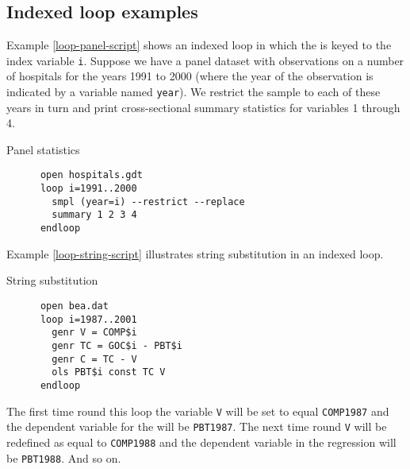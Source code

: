 \subsection{Indexed loop examples}


Example \ref{loop-panel-script} shows an indexed loop in which
	the  is keyed to the index variable
	\verb+i+.  Suppose we have a panel dataset with
	observations on a number of hospitals for the years 1991 to
	2000 (where the year of the observation is indicated by a
	variable named \verb+year+).  We restrict the
	sample to each of these years in turn and print
	cross-sectional summary statistics for variables 1 through
	4.

\begin{script}[htbp]
\caption{Panel statistics}
\label{loop-panel-script}

\begin{verbatim}
	  open hospitals.gdt
	  loop i=1991..2000
	    smpl (year=i) --restrict --replace
	    summary 1 2 3 4
	  endloop\end{verbatim}
\end{script}


	Example \ref{loop-string-script} illustrates string
	substitution in an indexed loop.

\begin{script}[htbp]
\caption{String
	  substitution}
\label{loop-string-script}

\begin{verbatim}
	  open bea.dat
	  loop i=1987..2001
	    genr V = COMP$i
	    genr TC = GOC$i - PBT$i
	    genr C = TC - V
	    ols PBT$i const TC V
	  endloop\end{verbatim}
\end{script}

The first time round this loop the variable
	\verb+V+ will be set to equal
	\verb+COMP1987+ and the dependent variable for the
	 will be \verb+PBT1987+. The
	next time round \verb+V+ will be redefined as
	equal to \verb+COMP1988+ and the dependent
	variable in the regression will be \verb+PBT1988+.
	And so on.

